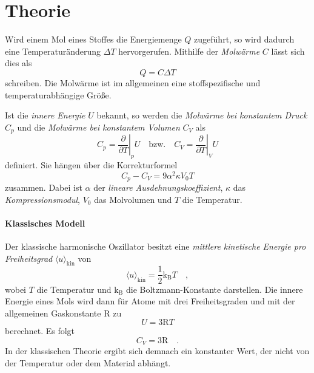 


\section{Theorie}
Wird einem Mol eines Stoffes die Energiemenge $Q$ zugeführt, so wird dadurch eine
Temperaturänderung $\Delta T$ hervorgerufen. Mithilfe der \textit{Molwärme} $C$ lässt sich dies als 
\begin{equation}
Q = C \Delta T
\end{equation}
schreiben. Die Molwärme ist im allgemeinen eine stoffspezifische und 
temperaturabhängige Größe.

Ist die \textit{innere Energie} $U$ bekannt, so werden die 
\textit{Molwärme bei konstantem Druck} $C_p$ und die 
\textit{Molwärme bei konstantem Volumen} $C_V$ als
\begin{equation}
C_p = \left. \frac{\partial}{\partial T} \right|_p U
\quad \text{bzw.} \quad 
C_V = \left. \frac{\partial}{\partial T} \right|_V U
\end{equation}
definiert. Sie hängen über die Korrekturformel 
\begin{equation}
C_p - C_V = 9 \alpha^2 \kappa V_0 T \label{eq:theorie:korrekturformel}
\end{equation}
zusammen. Dabei ist $\alpha$ der \textit{lineare Ausdehnungskoeffizient}, 
$\kappa$ das \textit{Kompressionsmodul}, $V_0$ das Molvolumen und $T$ die 
Temperatur.

\paragraph{Klassisches Modell}
	Der klassische harmonische Oszillator besitzt eine \textit{mittlere 
	kinetische 
	Energie 
	pro Freiheitsgrad} $\langle u \rangle_\text{kin}$ von
	\begin{equation}
	\langle u \rangle_\text{kin} = \frac{1}{2} \text{k}_\text{B} T \quad ,
	\end{equation}
	wobei $T$ die Temperatur und $\text{k}_\text{B}$ die Boltzmann-Konstante 
	darstellen. Die innere Energie eines Mols wird dann für Atome mit 
	drei Freiheitsgraden und mit der 
	allgemeinen Gaskonstante $\text{R}$ zu 
	\begin{equation}
	U = 3 \text{R} T
	\end{equation}
	berechnet. Es folgt 
	\begin{equation}
	C_V = 3 \text{R} \quad . \label{eq:theorie:C_klassisch}
	\end{equation}
	In der klassischen Theorie ergibt sich demnach ein konstanter Wert, 
	der nicht von der Temperatur oder dem Material abhängt.

